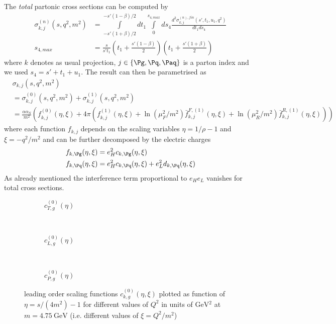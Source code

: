 The \textit{total} partonic cross sections can be computed by
\begin{align}
\sigma^{(n)}_{k,j}(s,q^2,m^2) &= \int\limits_{-s'(1+\beta)/2}^{-s'(1-\beta)/2} dt_1\int\limits_0^{s_{4,max}}ds_4 \frac{d^2\sigma^{(n),fin}_{k,j}(s',t_1,u_1,q^2)}{dt_1ds_4}\\
s_{4,max} &= \frac{s}{s' t_1}\left(t_1+\frac{s'(1-\beta)}{2}\right)\left(t_1+\frac{s'(1+\beta)}{2}\right)
\end{align}
where $k$ denotes as usual projection, $j\in\{\Pg,\Pq,\Paq\}$ is a parton index and we used $s_4 = s'+t_1+u_1$. The result can then be parametrised as
\begin{align}
&\sigma_{k,j}(s,q^2,m^2)\nonumber\\
 &= \sigma^{(0)}_{k,j}(s,q^2,m^2) + \sigma^{(1)}_{k,j}(s,q^2,m^2)\\
 &= \frac{\alpha\alpha_S}{m^2}\left(f_{k,j}^{(0)}(\eta,\xi) + 4\pi\left(f_{k,j}^{(1)}(\eta,\xi) + \ln(\mu_F^2/m^2)\bar f_{k,j}^{F,(1)}(\eta,\xi) + \ln(\mu_R^2/m^2)\bar f_{k,j}^{R,(1)}(\eta,\xi)\right)\right)
\end{align}
where each function $f_{k,j}$ depends on the scaling variables $\eta=1/\rho-1$ and $\xi=-q^2/m^2$ and can be further decomposed by the electric charges
\begin{align}
f_{k,\Pg}(\eta,\xi) &= e_H^2 c_{k,\Pg}(\eta,\xi)\\
f_{k,\Pq}(\eta,\xi) &= e_H^2 c_{k,\Pq}(\eta,\xi) + e_L^2 d_{k,\Pq}(\eta,\xi)
\end{align}
As already mentioned the interference term proportional to $e_H e_L$ vanishes for total cross sections.


\pagebreak
\begin{figure}[ht!]
\centering
\begin{subfigure}[t]{\textwidth}
	
	\caption{$c_{T,g}^{(0)}(\eta)$}
\end{subfigure}\\%
\begin{subfigure}[t]{\textwidth}
	
	\caption{$c_{L,g}^{(0)}(\eta)$}
\end{subfigure}\\%
\begin{subfigure}[t]{\textwidth}
	
	\caption{$c_{P,g}^{(0)}(\eta)$}
\end{subfigure}
\caption{leading order scaling functions $c_{k,g}^{(0)}(\eta,\xi)$ plotted as function of $\eta=s/(4m^2)-1$ for different values of $Q^2$ in units of $\si{\GeV^2}$ at $m=\SI{4.75}{\GeV}$ (i.e. different values of $\xi=Q^2/m^2$) }\label{fig:cg0}
\end{figure}


